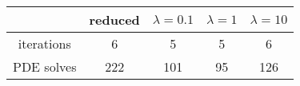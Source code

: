 \begin{tabular}{ccccc}
& reduced & $\lambda = 0.1$ & $\lambda = 1$ & $\lambda = 10$ \\
\hline
iterations & 6 & 5 & 5 & 6 \\
PDE solves & 222 & 101 & 95 & 126 \\
\hline
\end{tabular}
